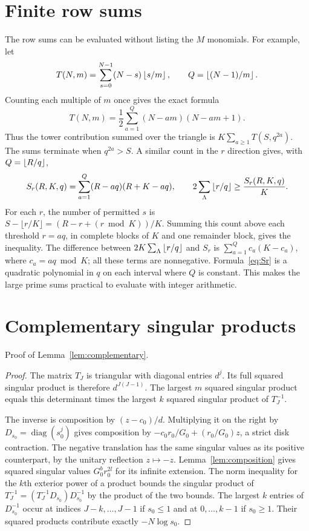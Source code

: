 \section{Finite row sums}\label{supp:rows}
The row sums can be evaluated without listing the $M$ monomials. For example, let
\[
 T(N,m)=\sum_{s=0}^{N-1}(N-s)\left\lfloor s/m\right\rfloor,
 \qquad Q=\left\lfloor (N-1)/m\right\rfloor.
\]
Counting each multiple of $m$ once gives the exact formula
\begin{equation}\label{eq:T-floor}
 T(N,m)=\frac12\sum_{a=1}^{Q}(N-am)(N-am+1).
\end{equation}
Thus the tower contribution summed over the triangle is
$K\sum_{a\geq1}T(S,q^{2a})$. The sums terminate when $q^{2a}>S$.
A similar count in the $r$ direction gives, with $Q=\left\lfloor R/q\right\rfloor$,
\begin{equation}\label{eq:Sr}
 S_r(R,K,q)=\sum_{a=1}^{Q}(R-aq)(R+K-aq),
 \qquad
 2\sum_{\Lambda}\left\lfloor r/q\right\rfloor\geq\frac{S_r(R,K,q)}K.
\end{equation}
For each $r$, the number of permitted $s$ is
$S-\lfloor r/K\rfloor=(R-r+(r\bmod K))/K$. Summing this count above
each threshold $r=aq$, in complete blocks of $K$ and one remainder block,
gives the inequality.
The difference between $2K\sum_\Lambda\left\lfloor r/q\right\rfloor$ and $S_r$ is
$\sum_{a=1}^{Q}c_a(K-c_a)$, where $c_a=aq\bmod K$; all these terms are nonnegative. Formula~\eqref{eq:Sr} is a quadratic polynomial in $q$ on each interval where $Q$ is constant. This makes the large prime sums practical to evaluate with integer arithmetic.



\section{Complementary singular products}\label{supp:complementary}
Proof of Lemma~\ref{lem:complementary}.
\begin{proof}
The matrix $T_J$ is triangular with diagonal entries $d^j$. Its full squared singular product is therefore $d^{J(J-1)}$. The largest $m$ squared singular product equals this determinant times the largest $k$ squared singular product of $T_J^{-1}$.

The inverse is composition by $(z-c_0)/d$. Multiplying it on the right by $D_{s_0}=\operatorname{diag}(s_0^j)$ gives composition by
$-c_0r_0/G_0+(r_0/G_0)z$, a strict disk contraction. The negative translation has the same singular
values as its positive counterpart, by the unitary reflection $z\mapsto-z$.
Lemma~\ref{lem:composition} gives squared singular values $G_0^b r_0^{2l}$ for its infinite extension. The norm inequality for the $k$th exterior power of a product bounds the singular product of
$T_J^{-1}=(T_J^{-1}D_{s_0})D_{s_0}^{-1}$ by the product of the two bounds. The largest $k$ entries of $D_{s_0}^{-1}$ occur at indices $J-k,\ldots,J-1$ if $s_0\leq1$ and at $0,\ldots,k-1$ if $s_0\geq1$. Their squared products contribute exactly $-N\log s_0$.
\end{proof}

